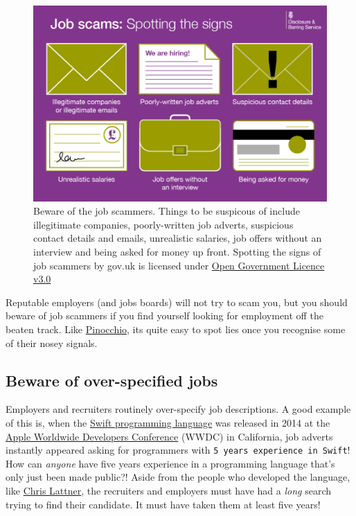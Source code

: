 \documentclass[
]{book}
\begin{document}
\begin{figure}

{\centering \includegraphics[width=0.98\linewidth]{images/Job-Scams-Signs-GOVUK} 

}

\caption{Beware of the job scammers. Things to be suspicous of include illegitimate companies, poorly-written job adverts, suspicious contact details and emails, unrealistic salaries, job offers without an interview and being asked for money up front. Spotting the signs of job scammers by gov.uk is licensed under \href{https://www.nationalarchives.gov.uk/doc/open-government-licence/version/3/}{Open Government Licence v3.0} \citep{jobscammers2}}\label{fig:jobscams-fig}
\end{figure}



Reputable employers (and jobs boards) will not try to scam you, but you should beware of job scammers if you find yourself looking for employment off the beaten track. Like \href{https://en.wikipedia.org/wiki/Pinocchio}{Pinocchio}, its quite easy to spot lies once you recognise some of their nosey signals. 🤥

\hypertarget{overspec}{%
\subsection{Beware of over-specified jobs}\label{overspec}}

Employers and recruiters routinely over-specify job descriptions. A good example of this is, when the \href{https://en.wikipedia.org/wiki/Swift_(programming_language)}{Swift programming language} was released in 2014 at the \href{https://en.wikipedia.org/wiki/Apple_Worldwide_Developers_Conference}{Apple Worldwide Developers Conference} (WWDC) in California, job adverts instantly appeared asking for programmers with \texttt{5\ years\ experience\ in\ Swift}! How can \emph{anyone} have five years experience in a programming language that's only just been made public?! Aside from the people who developed the language, like \href{https://en.wikipedia.org/wiki/Chris_Lattner}{Chris Lattner}, the recruiters and employers must have had a \emph{long} search trying to find their candidate. It must have taken them at least five years!
\end{document}
